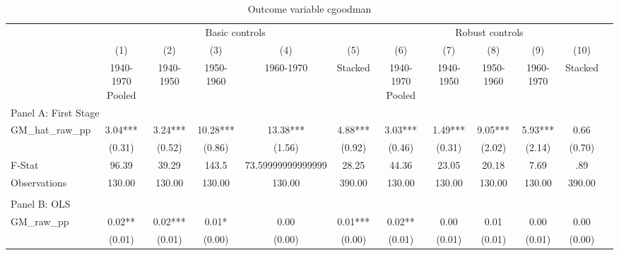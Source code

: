  \begin{table}[htbp]\centering {} \begin{threeparttable} \caption{Outcome variable cgoodman} \begin{tabular}{l*{11}{c}} \toprule
          &\multicolumn{5}{c}{Basic controls}                                   &\multicolumn{5}{c}{Robust controls}                                  \\\cmidrule(lr){2-6}\cmidrule(lr){7-11}
          &\multicolumn{1}{c}{(1)}&\multicolumn{1}{c}{(2)}&\multicolumn{1}{c}{(3)}&\multicolumn{1}{c}{(4)}&\multicolumn{1}{c}{(5)}&\multicolumn{1}{c}{(6)}&\multicolumn{1}{c}{(7)}&\multicolumn{1}{c}{(8)}&\multicolumn{1}{c}{(9)}&\multicolumn{1}{c}{(10)}\\
          &\multicolumn{1}{c}{1940-1970 Pooled}&\multicolumn{1}{c}{1940-1950}&\multicolumn{1}{c}{1950-1960}&\multicolumn{1}{c}{1960-1970}&\multicolumn{1}{c}{Stacked}&\multicolumn{1}{c}{1940-1970 Pooled}&\multicolumn{1}{c}{1940-1950}&\multicolumn{1}{c}{1950-1960}&\multicolumn{1}{c}{1960-1970}&\multicolumn{1}{c}{Stacked}\\
\cmidrule(lr){1-11}
\multicolumn{10}{l}{Panel A: First Stage}\\
\cmidrule(lr){1-11}
GM\_hat\_raw\_pp&      3.04***&      3.24***&     10.28***&     13.38***&      4.88***&      3.03***&      1.49***&      9.05***&      5.93***&      0.66   \\
          &    (0.31)   &    (0.52)   &    (0.86)   &    (1.56)   &    (0.92)   &    (0.46)   &    (0.31)   &    (2.02)   &    (2.14)   &    (0.70)   \\
\midrule
F-Stat    &     96.39   &     39.29   &     143.5   &73.59999999999999   &     28.25   &     44.36   &     23.05   &     20.18   &      7.69   &       .89   \\
Observations&    130.00   &    130.00   &    130.00   &    130.00   &    390.00   &    130.00   &    130.00   &    130.00   &    130.00   &    390.00   \\
\cmidrule[\heavyrulewidth](lr){1-11} \\ \cmidrule[\heavyrulewidth](lr){1-11}
\multicolumn{10}{l}{Panel B: OLS}\\
\cmidrule(lr){1-11}
GM\_raw\_pp &      0.02** &      0.02***&      0.01*  &      0.00   &      0.01***&      0.02** &      0.00   &      0.01   &      0.00   &      0.00   \\
          &    (0.01)   &    (0.01)   &    (0.00)   &    (0.00)   &    (0.00)   &    (0.01)   &    (0.01)   &    (0.01)   &    (0.01)   &    (0.00)   \\

\end{tabular}
\end{threeparttable}
\end{table}
